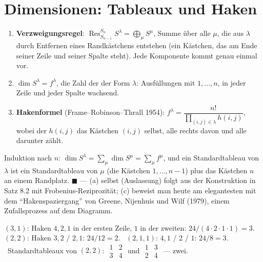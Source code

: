 \section{Dimensionen: Tableaux und Haken}

\begin{merksatz}
\begin{enumerate}[label=(\alph*), leftmargin=1.6em]
\item \textbf{Verzweigungsregel}: $\operatorname{Res}^{S_n}_{S_{n-1}}S^{\lambda} = \bigoplus_\mu S^{\mu}$, Summe über alle $\mu$, die aus $\lambda$ durch Entfernen eines Randkästchens entstehen (ein Kästchen, das am Ende seiner Zeile und seiner Spalte steht). Jede Komponente kommt genau einmal vor.
\item $\dim S^{\lambda} = f^{\lambda}$, die Zahl der  der Form $\lambda$: Ausfüllungen mit $1, \dots, n$, in jeder Zeile und jeder Spalte wachsend.
\item \textbf{Hakenformel} (Frame--Robinson--Thrall 1954): $f^{\lambda} = \dfrac{n!}{\prod_{(i,j)\in\lambda}h(i, j)}$, wobei der  $h(i, j)$ das Kästchen $(i, j)$ selbst, alle rechts davon und alle darunter zählt.
\end{enumerate}

Induktion nach $n$: $\dim S^{\lambda} = \sum_\mu\dim S^{\mu} = \sum_\mu f^{\mu}$, und ein Standardtableau von $\lambda$ ist ein Standardtableau von $\mu$ (die Kästchen $1, \dots, n - 1$) plus das Kästchen $n$ an einem Randplatz. $\blacksquare$ --- (a) selbst (Auslassung) folgt aus der Konstruktion in Satz 8.2 mit Frobenius-Reziprozität; (c) beweist man heute am elegantesten mit dem \enquote{Hakenspaziergang} von Greene, Nijenhuis und Wilf (1979), einem Zufallsprozess auf dem Diagramm.

$(3, 1)$: Haken $4, 2, 1$ in der ersten Zeile, $1$ in der zweiten: $24/(4\cdot2\cdot1\cdot1) = 3$. \checkmark\ $(2, 2)$: Haken $3, 2$ / $2, 1$: $24/12 = 2$. \checkmark\ $(2, 1, 1)$: $4, 1$ / $2$ / $1$: $24/8 = 3$. \checkmark\ Standardtableaux von $(2, 2)$: $\begin{smallmatrix}1 & 2\\ 3 & 4\end{smallmatrix}$ und $\begin{smallmatrix}1 & 3\\ 2 & 4\end{smallmatrix}$ --- zwei. \checkmark


\end{merksatz}
